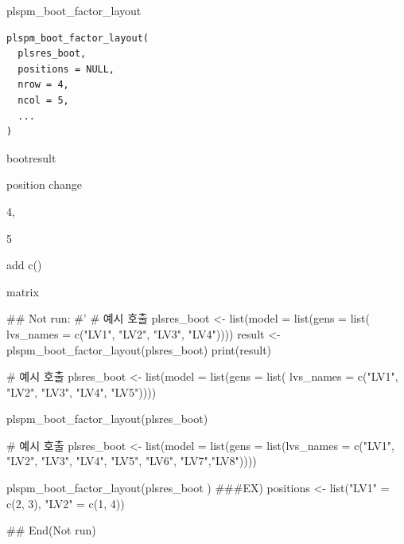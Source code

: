 \documentclass[a4paper]{book}
\begin{document}
%
\begin{Description}
plspm\_boot\_factor\_layout
\end{Description}
%
\begin{Usage}
\begin{verbatim}
plspm_boot_factor_layout(
  plsres_boot,
  positions = NULL,
  nrow = 4,
  ncol = 5,
  ...
)
\end{verbatim}
\end{Usage}
%
\begin{Arguments}
\begin{ldescription}
\item[\code{plsres\_boot}] bootresult

\item[\code{positions}] position change

\item[\code{nrow}] 4,

\item[\code{ncol}] 5

\item[\code{...}] add c()
\end{ldescription}
\end{Arguments}
%
\begin{Value}
matrix
\end{Value}
%
\begin{Examples}
\begin{ExampleCode}

\#\# Not run: 
#'
# 예시 호출
plsres_boot <- list(model = list(gens = list(
                  lvs_names = c("LV1", "LV2", "LV3", "LV4"))))
result <- plspm_boot_factor_layout(plsres_boot)
print(result)

# 예시 호출
plsres_boot <- list(model =
list(gens = list(
lvs_names = c("LV1", "LV2", "LV3", "LV4", "LV5"))))

plspm_boot_factor_layout(plsres_boot)

# 예시 호출
plsres_boot <- list(model = list(gens =
list(lvs_names = c("LV1", "LV2", "LV3",
"LV4", "LV5", "LV6", "LV7","LV8"))))


plspm_boot_factor_layout(plsres_boot )
###EX)
positions <- list("LV1" = c(2, 3), "LV2" = c(1, 4))


## End(Not run)


\end{ExampleCode}
\end{Examples}
\end{document}
